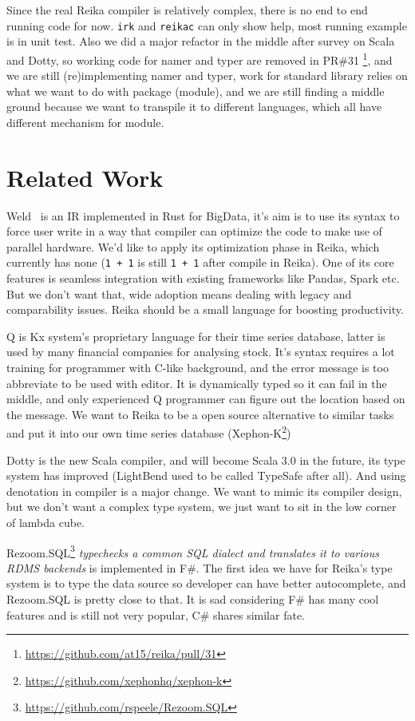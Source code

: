 \documentclass{article}
\begin{document}
Since the real Reika compiler is relatively complex, there is no end to end running code for now.
\verb+irk+ and \verb+reikac+ can only show help, most running example is in unit test.
Also we did a major refactor in the middle after survey on Scala and Dotty,
so working code for namer and typer are removed in PR\#31 \footnote{\url{https://github.com/at15/reika/pull/31}},
and we are still (re)implementing namer and typer,
work for standard library relies on what we want to do with package (module), and we are still finding
a middle ground because we want to transpile it to different languages, which all have different mechanism for module.

\section{Related Work}
\label{sec:related-work}

Weld~\cite{palkar2017weld} is an IR implemented in Rust for BigData,
it's aim is to use its syntax to force user write in a way that compiler can optimize the code to make use of parallel hardware.
We'd like to apply its optimization phase in Reika, which currently has none (\texttt{1 + 1} is still \texttt{1 + 1} after compile in Reika).
One of its core features is seamless integration with existing frameworks like Pandas, Spark etc.
But we don't want that, wide adoption means dealing with legacy and comparability issues.
Reika should be a small language for boosting productivity.

Q is Kx system's proprietary language for their time series database,
latter is used by many financial companies for analysing stock.
It's syntax requires a lot training for programmer with C-like background,
and the error message is too abbreviate to be used with editor.
It is dynamically typed so it can fail in the middle, and only experienced Q programmer can figure out the location based on the message.
We want to Reika to be a open source alternative to similar tasks and
put it into our own time series database (Xephon-K\footnote{\url{https://github.com/xephonhq/xephon-k}})

Dotty is the new Scala compiler, and will become Scala 3.0 in the future,
its type system has improved (LightBend used to be called TypeSafe after all).
And using denotation in compiler is a major change.
We want to mimic its compiler design,
but we don't want a complex type system, we just want to sit in the low corner of lambda cube.

Rezoom.SQL\footnote{\url{https://github.com/rspeele/Rezoom.SQL}}
\textit{typechecks a common SQL dialect and translates it to various RDMS backends} is implemented in F\#.
The first idea we have for Reika's type system is to type the data source so developer can have better autocomplete, and Rezoom.SQL is pretty close to that.
It is sad considering F\# has many cool features and is still not very popular, C\# shares similar fate.
\end{document}
